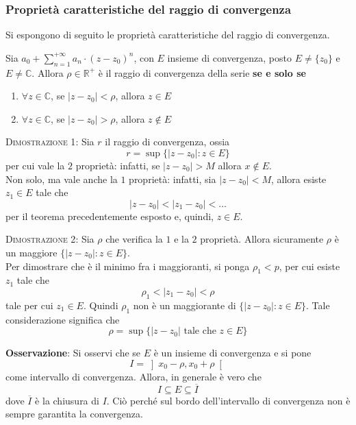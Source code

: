 \documentclass[a4paper]{extarticle}
\begin{document}
\vspace{1em}
\subsubsection{Proprietà caratteristiche del raggio di convergenza}
Si espongono di seguito le proprietà caratteristiche del raggio di convergenza.


Sia $a_0 + \sum_{n=1}^{+\infty} a_n \cdot (z-z_0)^n$, con $E$ insieme di convergenza, posto $E \neq \{z_0\}$ e $E \neq \mathbb{C}$. Allora $\rho \in \mathbb{R}^+$ è il raggio di convergenza della serie \textbf{se e solo se}
\begin{enumerate}
    \item $\forall z \in \mathbb{C}$, se $\left \vert z-z_0 \right \vert < \rho$, allora $z \in E$
    \item $\forall z \in \mathbb{C}$, se $\left \vert z-z_0 \right \vert > \rho$, allora $z \notin E$
\end{enumerate}

\vspace{2em}
\noindent
\normalfont \normalsize
\textsc{Dimostrazione 1}: Sia $r$ il raggio di convergenza, ossia
\[r = \sup \{\left \vert z - z_0 \right \vert : z \in E\}\]
per cui vale la $2$ proprietà: infatti, se $\left \vert z - z_0 \right \vert > M$ allora $x \notin E$.\\
Non solo, ma vale anche la $1$ proprietà: infatti, sia $\left \vert z - z_0 \right \vert < M$, allora esiste $z_1 \in E$ tale che
\[\left \vert z - z_0 \right \vert < \left \vert z_1 - z_0 \right \vert < \dots\]
per il teorema precedentemente esposto e, quindi, $z \in E$.

\vspace{2em}
\noindent
\normalfont \normalsize
\textsc{Dimostrazione 2}: Sia $\rho$ che verifica la $1$ e la $2$ proprietà. Allora sicuramente $\rho$ è un maggiore $\{\left \vert z - z_0 \right \vert : z \in E\}$.\\
Per dimostrare che è il minimo fra i maggioranti, si ponga $\rho_1 < p$, per cui esiste $z_1$ tale che
\[\rho_1 < \left \vert z_1 - z_0 \right \vert < \rho\]
tale per cui $z_1 \in E$. Quindi $\rho_1$ non è un maggiorante di $\{\left \vert z - z_0 \right \vert : z \in E\}$. Tale considerazione significa che
\[\rho = \sup \{\left \vert z - z_0 \right \vert \text{ tale che } z \in E\}\]

\vspace{1em}
\noindent
\textbf{Osservazione}: Si osservi che se $E$ è un insieme di convergenza e si pone
\[I = \left ] x_0 - \rho, x_0 + \rho \right[\]
come intervallo di convergenza. Allora, in generale è vero che
\[I \subseteq E \subseteq \overline{I}\]
dove $\overline{I}$ è la chiusura di $I$. Ciò perché sul bordo dell'intervallo di convergenza non è sempre garantita la convergenza.
\end{document}
